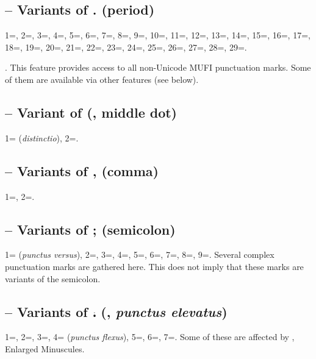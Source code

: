 \subsection{ –
  Variants of . (period)}
1=, 2=, 3=, 4=, 5=, 6=,
7=, 8=, 9=, 10=, 11=, 12=,
13=, 14=, 15=, 16=, 17=,
18=, 19=, 20=, 21=, 22=,
23=, 24=, 25=, 26=, 27=,
28=, 29=.

. This feature provides access to all non-Unicode MUFI punctuation marks. Some of them
are available via other features (see below).

\subsection{ – Variant of {\textperiodcentered} (, middle dot)}
1= (\textit{distinctio}), 2=.

\subsection{ –
Variants of , (comma)}
1=, 2=.

\subsection{ –
Variants of ; (semicolon)}
1= (\textit{punctus versus}), 2=, 3=, 4=,
5=, 6=, 7=, 8=, 9=. Several complex
punctuation marks are gathered here. This does not imply that these marks are variants of
the semicolon.

\subsection{ – Variants of ⹎ (, \textit{punctus elevatus})}
1=, 2=, 3=, 4= (\textit{punctus flexus}),
5=, 6=, 7=. Some of these are affected by ,
Enlarged Minuscules.

